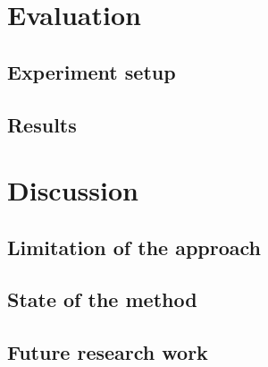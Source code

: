 \documentclass[a4paper]{article}
\begin{document}
\section{Evaluation}

\subsection{Experiment setup}

\subsection{Results}

\section{Discussion}

\subsection{Limitation of the approach}

\subsection{State of the method}

\subsection{Future research work}

\appendix
\setlength{\parskip}{0pt}
\printbibliography
\end{document}
